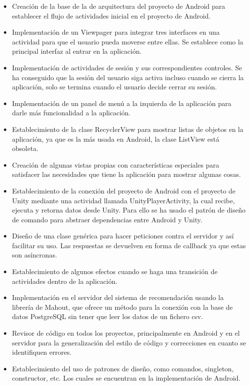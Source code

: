 \begin{itemize}
            \item Creación de la base de la de arquitectura del proyecto de Android para establecer el flujo de actividades inicial en el proyecto de Android.
            \item Implementación de un Viewpager para integrar tres interfaces en una actividad para que el usuario pueda moverse entre ellas. Se establece como la principal 
            interfaz al entrar en la aplicación.
            \item Implementación de actividades de sesión y sus correspondientes controles. Se ha conseguido que la sesión del usuario siga activa incluso cuando se cierra 
            la aplicación, solo se termina cuando el usuario decide cerrar su sesión.
            \item Implementación de un panel de menú a la izquierda de la aplicación para darle más funcionalidad a la aplicación.
            \item Establecimiento de la clase RecyclerView para mostrar listas de objetos en la aplicación, ya que es la más usada en Android, la clase ListView está obsoleta.
            \item Creación de algunas vistas propias con características especiales para satisfacer las necesidades 
            que tiene la aplicación para mostrar algunas cosas.
            \item Establecimiento de la conexión del proyecto de Android con el proyecto de Unity mediante una actividad llamada UnityPlayerActivity, la cual recibe, ejecuta y retorna datos
            desde Unity. Para ello se ha usado el patrón de diseño de comando para abstraer dependencias entre Android y Unity.
            \item Diseño de una clase genérica para hacer peticiones contra el servidor y así facilitar su uso. Las respuestas se devuelven 
            en forma de callback ya que estas son asíncronas.
            \item Establecimiento de algunos efectos cuando se haga una transición de actividades dentro de la aplicación.
            \item Implementación en el servidor del sistema de recomendación usando la 
            librería de Mahout, que ofrece un método para la conexión con la base de datos 
            PostgreSQL sin tener que leer los datos de un fichero csv.
            \item Revisor de código en todos los proyectos, principalmente en Android y en el servidor para la generalización del estilo de código y correcciones 
            en cuanto se identifiquen errores.
            \item Establecimiento del uso de patrones de diseño, como comandos, singleton, 
            constructor, etc. Los cuales se encuentran en la implementación de Android. 
        \end{itemize}
